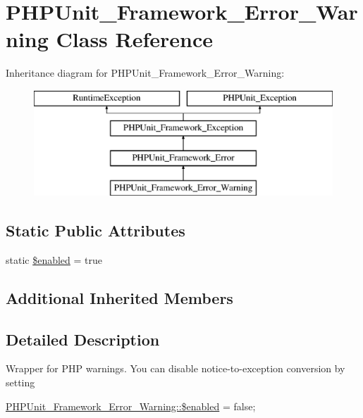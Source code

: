 \hypertarget{class_p_h_p_unit___framework___error___warning}{}\section{P\+H\+P\+Unit\+\_\+\+Framework\+\_\+\+Error\+\_\+\+Warning Class Reference}
\label{class_p_h_p_unit___framework___error___warning}
Inheritance diagram for P\+H\+P\+Unit\+\_\+\+Framework\+\_\+\+Error\+\_\+\+Warning\+:\begin{figure}[H]
\begin{center}
\leavevmode
\includegraphics[height=4.000000cm]{class_p_h_p_unit___framework___error___warning}
\end{center}
\end{figure}
\subsection*{Static Public Attributes}
\begin{DoxyCompactItemize}
\item 
static \mbox{\hyperlink{class_p_h_p_unit___framework___error___warning_a8d376199cc641e3e7af6e1a0d5c736d9}{\$enabled}} = true
\end{DoxyCompactItemize}
\subsection*{Additional Inherited Members}


\subsection{Detailed Description}
Wrapper for P\+HP warnings. You can disable notice-\/to-\/exception conversion by setting

{\ttfamily  \mbox{\hyperlink{class_p_h_p_unit___framework___error___warning_a8d376199cc641e3e7af6e1a0d5c736d9}{P\+H\+P\+Unit\+\_\+\+Framework\+\_\+\+Error\+\_\+\+Warning\+::\$enabled}} = false; } 

